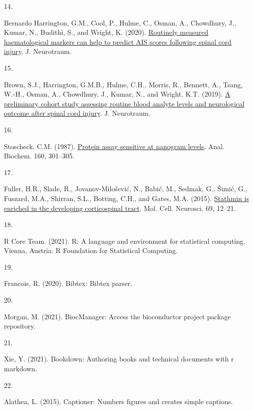 \documentclass[
]{article}
\newlength{\cslhangindent}
\newlength{\csllabelwidth}
\newlength{\cslentryspacingunit} %
\newenvironment{CSLReferences}[2] %
 {%
  \setlength{\parindent}{0pt}
  \ifodd #1
  \let\oldpar\par
  \def\par{\hangindent=\cslhangindent\oldpar}
  \fi
  \setlength{\parskip}{#2\cslentryspacingunit}
 }%
 {}
\newcommand{\CSLLeftMargin}[1]{\parbox[t]{\csllabelwidth}{#1}}
\newcommand{\CSLRightInline}[1]{\parbox[t]{\linewidth - \csllabelwidth}{#1}\break}
\begin{document}
\begin{CSLReferences}{0}{0}
\leavevmode{}%
\CSLLeftMargin{14. }
\CSLRightInline{Bernardo Harrington, G.M., Cool, P., Hulme, C., Osman, A., Chowdhury, J., Kumar, N., Budithi, S., and Wright, K. (2020). \href{https://doi.org/10.1089/neu.2020.7144}{Routinely measured haematological markers can help to predict {AIS} scores following spinal cord injury}. J. Neurotraum.}

\leavevmode{}%
\CSLLeftMargin{15. }
\CSLRightInline{Brown, S.J., Harrington, G.M.B., Hulme, C.H., Morris, R., Bennett, A., Tsang, W.-H., Osman, A., Chowdhury, J., Kumar, N., and Wright, K.T. (2019). \href{https://doi.org/10.1089/neu.2019.6495}{A preliminary cohort study assessing routine blood analyte levels and neurological outcome after spinal cord injury}. J. Neurotraum.}

\leavevmode{}%
\CSLLeftMargin{16. }
\CSLRightInline{Stoscheck, C.M. (1987). \href{https://doi.org/10.1016/0003-2697(87)90051-0}{Protein assay sensitive at nanogram levels}. Anal. Biochem. 160, 301--305.}

\leavevmode{}%
\CSLLeftMargin{17. }
\CSLRightInline{Fuller, H.R., Slade, R., Jovanov-Milošević, N., Babić, M., Sedmak, G., Šimić, G., Fuszard, M.A., Shirran, S.L., Botting, C.H., and Gates, M.A. (2015). \href{https://doi.org/10.1016/j.mcn.2015.09.003}{Stathmin is enriched in the developing corticospinal tract}. Mol. Cell. Neurosci. 69, 12--21.}

\leavevmode{}%
\CSLLeftMargin{18. }
\CSLRightInline{R Core Team. (2021). R: {A} language and environment for statistical computing. {Vienna, Austria}: {R Foundation for Statistical Computing}.}

\leavevmode{}%
\CSLLeftMargin{19. }
\CSLRightInline{Francois, R. (2020). Bibtex: {Bibtex} parser.}

\leavevmode{}%
\CSLLeftMargin{20. }
\CSLRightInline{Morgan, M. (2021). {BiocManager}: {Access} the bioconductor project package repository.}

\leavevmode{}%
\CSLLeftMargin{21. }
\CSLRightInline{Xie, Y. (2021). Bookdown: {Authoring} books and technical documents with r markdown.}

\leavevmode{}%
\CSLLeftMargin{22. }
\CSLRightInline{Alathea, L. (2015). Captioner: {Numbers} figures and creates simple captions.}


\end{CSLReferences}
\end{document}
